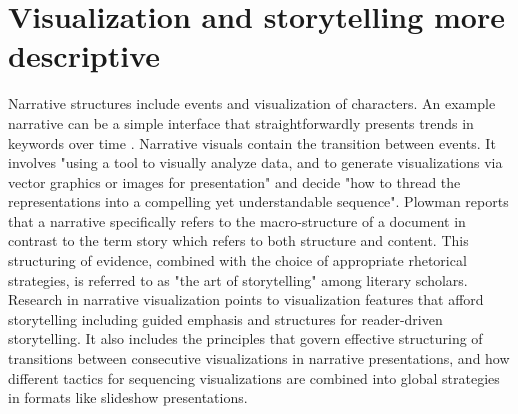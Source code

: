 \documentclass{egpubl}
\begin{document}
\section{Visualization and storytelling more descriptive}
Narrative structures include events and visualization of characters. An example narrative can be a simple interface that straightforwardly presents trends in keywords over time \cite{fisher}. Narrative visuals contain the transition between events. It involves "using a tool to visually analyze data, and to generate visualizations via vector graphics or images for presentation" and decide "how to thread the representations into a compelling yet understandable sequence"\cite{hullman2013deeper}. Plowman \cite{plowman1999,eccles2007} reports that a narrative specifically refers to the macro-structure of a document in contrast to the term story which refers to both structure and content. This structuring of evidence, combined with the choice of appropriate rhetorical strategies, is referred to as "the art of storytelling" among literary scholars. Research in narrative visualization points to visualization features that afford storytelling including guided emphasis and structures for reader-driven storytelling. It also includes the principles that govern effective structuring of transitions
between consecutive visualizations in narrative presentations, and how different tactics for sequencing visualizations are combined into global strategies in formats like slideshow presentations.
\end{document}
